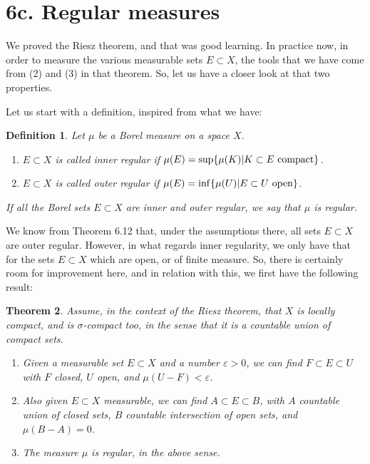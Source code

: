 \documentclass[12pt]{amsbook}
\newtheorem{theorem}{Theorem}[chapter]
\newtheorem{definition}[theorem]{Definition}
\begin{document}
\section*{6c. Regular measures}

We proved the Riesz theorem, and that was good learning. In practice now, in order to measure the various measurable sets $E\subset X$, the tools that we have come from (2) and (3) in that theorem. So, let us have a closer look at that two properties.

\bigskip

Let us start with a definition, inspired from what we have:

\begin{definition}
Let $\mu$ be a Borel measure on a space $X$.
\begin{enumerate}
\item $E\subset X$ is called inner regular if $\mu(E)=\sup\{\mu(K)|K\subset E\ {\rm compact}\}$.

\item $E\subset X$ is called outer regular if $\mu(E)=\inf\{\mu(U)|E\subset U\ {\rm open}\}$.
\end{enumerate}
If all the Borel sets $E\subset X$ are inner and outer regular, we say that $\mu$ is regular.
\end{definition}

We know from Theorem 6.12 that, under the assumptions there, all sets $E\subset X$ are outer regular. However, in what regards inner regularity, we only have that for the sets $E\subset X$ which are open, or of finite measure. So, there is certainly room for improvement here, and in relation with this, we first have the following result:

\begin{theorem}
Assume, in the context of the Riesz theorem, that $X$ is locally compact, and is $\sigma$-compact too, in the sense that it is a countable union of compact sets.
\begin{enumerate}
\item Given a measurable set $E\subset X$ and a number $\varepsilon>0$, we can find $F\subset E\subset U$ with $F$ closed, $U$ open, and $\mu(U-F)<\varepsilon$. 

\item Also given $E\subset X$ measurable, we can find $A\subset E\subset B$, with $A$ countable union of closed sets, $B$ countable intersection of open sets, and $\mu(B-A)=0$. 

\item The measure $\mu$ is regular, in the above sense.
\end{enumerate}
\end{theorem}
\end{document}
